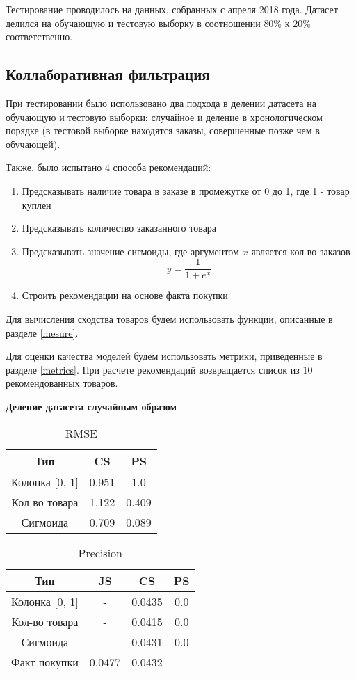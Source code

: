 Тестирование проводилось на данных, собранных с апреля 2018 года. Датасет делился
на обучающую и тестовую выборку в соотношении 80\% к 20\% соответственно.

\subsection{Коллаборативная фильтрация}

При тестировании было использовано два подхода в делении датасета на обучающую
и тестовую выборки: случайное и деление в хронологическом порядке (в тестовой
выборке находятся заказы, совершенные позже чем в обучающей).

Также, было испытано 4 способа рекомендаций:
\begin{enumerate}
  \item Предсказывать наличие товара в заказе в промежутке от 0 до 1, где 1 - товар куплен
  \item Предсказывать количество заказанного товара
  \item Предсказывать значение сигмоиды, где аргументом $x$ является кол-во заказов
  \begin{equation}
    y = \frac{1}{1 + e^x}
  \end{equation}
  \item Строить рекомендации на основе факта покупки
\end{enumerate}
Для вычисления сходства товаров будем использовать функции, описанные в разделе \ref{mesure}.

Для оценки качества моделей будем использовать метрики, приведенные в разделе \ref{metrics}.
При расчете рекомендаций возвращается список из 10 рекомендованных товаров.


\textbf{Деление датасета случайным образом}

\begin{table}[H]
  \centering
  \begin{tabular} { | c | c | c | }
    \hline
    Тип & CS & PS \\
    \hline
    Колонка [0, 1] & 0.951 & 1.0 \\
    \hline
    Кол-во товара & 1.122 & 0.409 \\
    \hline
    Сигмоида & 0.709 & 0.089 \\
    \hline
  \end{tabular}
  \caption{RMSE}
\end{table}

\begin{table}[H]
  \centering
  \begin{tabular} { | c | c | c | c | }
    \hline
    Тип & JS & CS & PS \\
    \hline
    Колонка [0, 1] & - & 0.0435 & 0.0 \\
    \hline
    Кол-во товара & - & 0.0415 & 0.0 \\
    \hline
    Сигмоида & - & 0.0431 & 0.0 \\
    \hline
    Факт покупки & 0.0477 & 0.0432 & - \\
    \hline
  \end{tabular}
  \caption{Precision}
\end{table}

